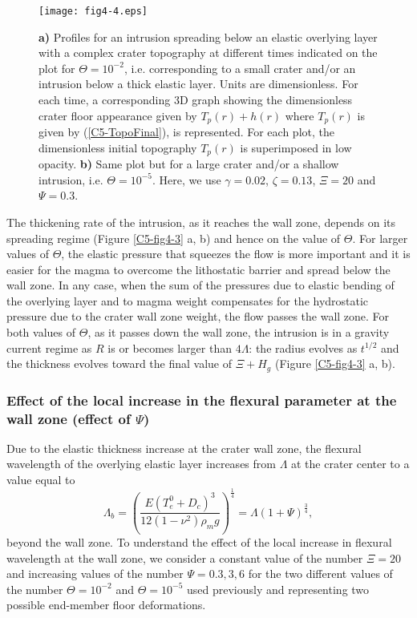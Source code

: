 \begin{figure}[h!]
  \graphicspath{ {/Users/thorey/Documents/These/Submission/Article/FFC_JGR_2013/Paper_APRES_2nd_REVIEW/} }
  \centering
  \noindent\texttt{[image: fig4-4.eps]}
  \caption{ \textbf{a) } Profiles for  an intrusion spreading below an
    elastic  overlying  layer  with  a complex  crater  topography  at
    different times  indicated on the plot  for $\Theta=10^{-2}$, i.e.
    corresponding to a small crater  and/or an intrusion below a thick
    elastic  layer.   Units  are  dimensionless.   For  each  time,  a
    corresponding  3D graph  showing  the  dimensionless crater  floor
    appearance  given  by $T_p(r)+h(r)$  where  $T_p(r)$  is given  by
    (\ref{C5-TopoFinal}),   is  represented.    For  each   plot,  the
    dimensionless initial  topography $T_p(r)$ is superimposed  in low
    opacity. \textbf{b)}  Same plot  but for a  large crater  and/or a
    shallow   intrusion,  i.e.    $\Theta=10^{-5}$.    Here,  we   use
    $\gamma=0.02$, $\zeta=0.13$, $\Xi=20$ and $\Psi=0.3$.}
  \label{C5-fig4-4}
\end{figure}

		 
The thickening  rate of the  intrusion, as  it reaches the  wall zone,
depends  on its  spreading regime  (Figure \ref{C5-fig4-3}  a, b)  and
hence on  the value of  $\Theta$. For  larger values of  $\Theta$, the
elastic pressure  that squeezes the flow  is more important and  it is
easier for  the magma to  overcome the lithostatic barrier  and spread
below the wall zone.   In any case, when the sum  of the pressures due
to  elastic  bending  of  the  overlying layer  and  to  magma  weight
compensates for the  hydrostatic pressure due to the  crater wall zone
weight, the flow passes the wall zone. For both values of $\Theta$, as
it passes  down the wall zone,  the intrusion is in  a gravity current
regime as $R$ is or becomes larger than $4\Lambda$: the radius evolves
as  $t^{1/2}$ and  the thickness  evolves  toward the  final value  of
$\Xi + H_g$ (Figure \ref{C5-fig4-3} a, b).
	
\subsubsection{Effect of the local  increase in the flexural parameter
  at the wall zone (effect of $\Psi$)}
		
Due to  the elastic thickness  increase at  the crater wall  zone, the
flexural  wavelength of  the  overlying elastic  layer increases  from
$\Lambda$ at the crater center to a value equal to
\begin{equation}
  \Lambda_{b}=\left( \frac{E(T_{e}^0+D_c)^3}{12(1-\nu^2)\rho_m g}\right)^{\frac{1}{4}} = \Lambda (1+\Psi)^{\frac{3}{4}},
\end{equation}
beyond the wall  zone. To understand the effect of  the local increase
in flexural wavelength at the wall  zone, we consider a constant value
of  the   number  $\Xi=20$  and   increasing  values  of   the  number
$\Psi=0.3,3,6$   for  the   two   different  values   of  the   number
$\Theta=10^{-2}$ and $\Theta=10^{-5}$ used previously and representing
two possible end-member floor deformations.
		
